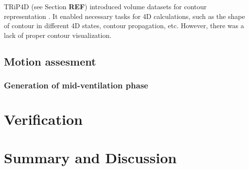 \documentclass[type=dr, dr=rernat, accentcolor=tud7b,colorbacktitle, bigchapter, openright, twoside, 12pt ]{tudthesis}
\begin{document}
TRiP4D (see Section \textbf{REF}) introduced volume datasets for contour representation \cite{Richter2012}. It enabled necessary tasks for 4D calculations, such as the shape of contour in different 4D states, contour propagation, etc. However, there was a lack of proper contour visualization. 

\subsection{Motion assesment}

\subsubsection{Generation of mid-ventilation phase}


\section{Verification}

\section{Summary and Discussion}



{}
% 
\end{document}
